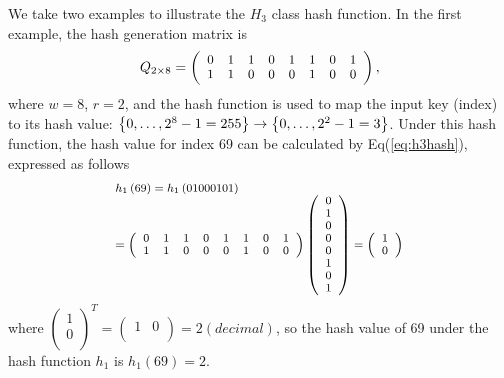 \documentclass[10pt,journal,letterpaper]{IEEEtran}
\begin{document}
We take two examples to illustrate the $H_3$ class hash function. In the first example, the hash generation matrix is
\begin{equation}
\footnotesize
{Q_{2 \times 8}} = \left( {\begin{array}{*{20}{c}}
   0 & 1 & 1 & 0 & 1 & 1 & 0 & 1  \\
   1 & 1 & 0 & 0 & 0 & 1 & 0 & 0  \\
\end{array}} \right),
\label{eq:h1matrix}
\end{equation}
where $w=8$, $r=2$, and the hash function is used to map the input key (index) to its hash value: $\left\{ {0, \ldots ,{{\rm{2}}^{\rm{8}}} - {\rm{1}} = {\rm{255}}} \right\} \to \left\{ {0, \ldots ,{{\rm{2}}^{\rm{2}}} - {\rm{1}} = {\rm{3}}} \right\}$. Under this hash function, the hash value for index 69 can be calculated by Eq(\ref{eq:h3hash}), expressed as follows
\begin{equation}
\scriptsize
\begin{array}{l}
 h_1\left( {69} \right) = h_1\left( {{\rm{01000101}}} \right) \\
  = \left( {\begin{array}{*{20}{c}}
   0 & 1 & 1 & 0 & 1 & 1 & 0 & 1  \\
   1 & 1 & 0 & 0 & 0 & 1 & 0 & 0  \\
\end{array}} \right)\left( {\begin{array}{*{20}{c}}
   0  \\
   1  \\
   0  \\
   0  \\
   0  \\
   1  \\
   0  \\
   1  \\
\end{array}} \right) = \left( {\begin{array}{*{20}{c}}
   1  \\
   0  \\
\end{array}} \right) \\
 \end{array}
\label{eq:h3example1}
\end{equation}
where ${\left( {\begin{array}{*{20}{c}}
   1  \\
   0  \\
\end{array}} \right)^T} = \left( {\begin{array}{*{20}{c}}
   1 & 0  \\
\end{array}} \right) = 2\left( {decimal} \right)$, so the hash value of 69 under the hash function $h_1$ is $h_1(69)=2$.
\end{document}

